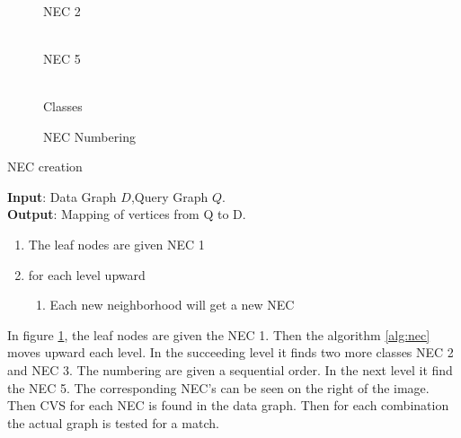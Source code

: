 \begin{figure}[h]
\begin{minipage}{.2\textwidth}
\\NEC 2\hfill \\
\\NEC 5 \hfill \\
\\Classes
\end{minipage}

 \caption{NEC Numbering}
 \label{fig:nec}
\end{figure}


\begin{algorithm}[H]

\caption{NEC creation}
\textbf{Input}: Data Graph $D$,Query Graph $Q$.\\
\textbf{Output}: Mapping of vertices from Q to D.\\
\begin{algorithmic}
\item \begin{enumerate}
\item The leaf nodes are given NEC 1
\item for each level upward
\begin{enumerate}
\item Each new neighborhood will get a new NEC
\end{enumerate}
\end{enumerate}
\end{algorithmic}
\label{alg:nec}
\end{algorithm}
\hspace{10mm} In figure \ref{fig:nec}, the leaf nodes are given the NEC 1. Then the algorithm \ref{alg:nec} moves upward each level. In the succeeding level it finds two more classes NEC 2 and NEC 3. The numbering are given a sequential order. In the next level it find the NEC 5. The corresponding NEC's can be seen on the right of the image. Then CVS for each NEC is found in the data graph. Then for each combination the actual graph is tested for a match. 

